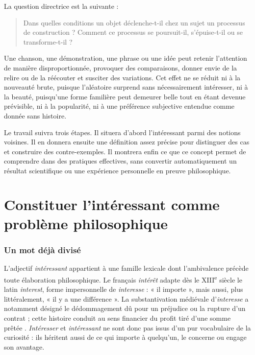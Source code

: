 \documentclass[11pt,a4paper]{article}
\begin{document}
La question directrice est la suivante :

\begin{quote}
Dans quelles conditions un objet déclenche-t-il chez un sujet un processus de
construction ? Comment ce processus se poursuit-il, s'épuise-t-il ou se
transforme-t-il ?
\end{quote}

Une chanson, une démonstration, une phrase ou une idée peut retenir l'attention
de manière disproportionnée, provoquer des comparaisons, donner envie de la
relire ou de la réécouter et susciter des variations. Cet effet ne se réduit ni à la nouveauté brute, puisque l'aléatoire
surprend sans nécessairement intéresser, ni à la beauté, puisqu'une forme
familière peut demeurer belle tout en étant devenue prévisible, ni à la
popularité, ni à une préférence subjective entendue comme donnée sans histoire.

Le travail suivra trois étapes. Il situera d'abord l'intéressant parmi des
notions voisines. Il en donnera ensuite une définition assez précise pour
distinguer des cas et construire des contre-exemples. Il montrera enfin ce que
ce concept permet de comprendre
dans des pratiques effectives, sans convertir automatiquement un résultat
scientifique ou une expérience personnelle en preuve philosophique.

\part{Constituer l'intéressant comme problème philosophique}

\section{Un mot déjà divisé}

L'adjectif \emph{intéressant} appartient à une famille lexicale dont
l'ambivalence précède toute élaboration philosophique. Le français
\emph{intérêt} adapte dès le XIII\textsuperscript{e} siècle le latin
\emph{interest}, forme impersonnelle de \emph{interesse} : « il importe », mais
aussi, plus littéralement, « il y a une différence ». La substantivation
médiévale d'\emph{interesse} a notamment désigné le dédommagement dû pour un
préjudice ou la rupture d'un contrat ; cette histoire conduit au sens financier
du profit tiré d'une somme prêtée
\parencite{academie2026interet,cnrtl2026interet}. \emph{Intéresser} et
\emph{intéressant} ne sont donc pas issus d'un pur vocabulaire de la curiosité :
ils héritent aussi de ce qui importe à quelqu'un, le concerne ou engage son
avantage.
\end{document}
